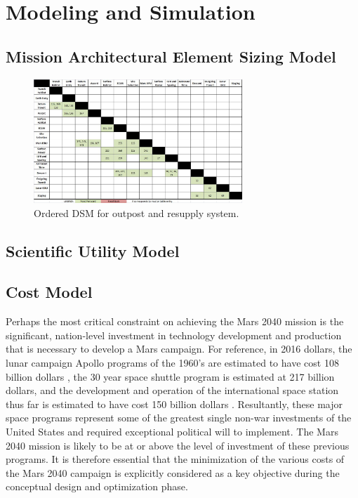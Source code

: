 \documentclass[]{aiaa-pretty}
\begin{document}
\section{Modeling and Simulation}
\label{sec:model}

\subsection{Mission Architectural Element Sizing Model}
\begin{figure}[h!]
	\centering
	\includegraphics[width=0.7\textwidth]{OrderedDSM}
	\caption{Ordered DSM for outpost and resupply system.}
	\label{fig:orderedDSM}
\end{figure}


\subsection{Scientific Utility Model}

\subsection{Cost Model}
Perhaps the most critical constraint on achieving the Mars 2040 mission is the significant, nation-level investment in technology development and production that is necessary to develop a Mars campaign. For reference, in 2016 dollars, the lunar campaign Apollo programs of the 1960’s are estimated to have cost 108 billion dollars \cite{stine2008crs}, the 30 year space shuttle program is estimated at 217 billion dollars, and the development and operation of the international space station thus far is estimated to have cost 150 billion dollars \cite{lafleur2010costs}. Resultantly, these major space programs represent some of the greatest single non-war investments of the United States and required exceptional political will to implement. The Mars 2040 mission is likely to be at or above the level of investment of these previous programs. It is therefore essential that the minimization of the various costs of the Mars 2040 campaign is explicitly considered as a key objective during the conceptual design and optimization phase.
\end{document}
